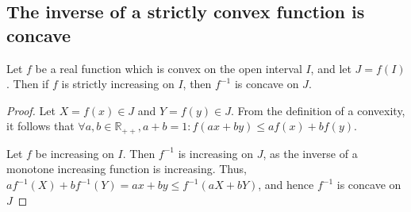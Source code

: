\begin{appendices}
\subsection{The inverse of a strictly convex function is concave} %
\label{sub:the_inverse_of_a_strictly_convex_function_is_concave}
\begin{theorem}
Let $f$ be a real function which is convex on the open interval $I$, and let $J=f(I)$. Then if $f$ is strictly increasing on $I$, then $f^{-1}$ is concave on $J$.
\end{theorem}
 \begin{proof}
 Let $X=f(x)\in J$ and $Y=f(y)\in J$. From the definition of a convexity, it follows that $\forall a,b\in \mathbb{R}_{++}, a+b=1:f(ax+by)\leq af(x)+bf(y)$. 

Let $f$ be increasing on $I$. Then $f^{-1}$ is increasing on $J$, as the inverse of a monotone increasing function is increasing. Thus, $af^{-1}(X)+bf^{-1}(Y)=ax+by\leq f^{-1}(aX+bY)$, and hence $f^{-1}$ is concave on $J$
 \end{proof}


\end{appendices}
